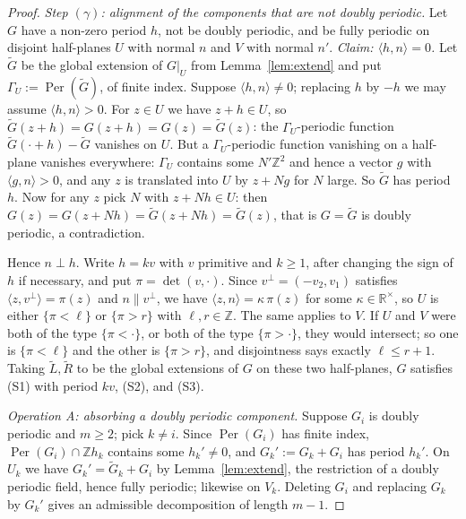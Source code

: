 \documentclass[11pt,reqno]{amsart}
\theoremstyle{plain}
\theoremstyle{definition}
\theoremstyle{remark}
\theoremstyle{plain}
\theoremstyle{remark}
\theoremstyle{definition}
\numberwithin{equation}{section}
\DeclareMathOperator{\Per}{Per}
\newcommand{\R}{\mathbb{R}}
\newcommand{\Z}{\mathbb{Z}}
\begin{document}
\begin{proof}
\emph{Step $(\gamma)$: alignment of the components that are not doubly
periodic.}  Let $G$ have a non-zero period $h$, not be doubly periodic, and be
fully periodic on disjoint half-planes $U$ with normal $n$ and $V$ with normal
$n'$.  \emph{Claim: $\langle h,n\rangle=0$.}  Let $\widetilde G$ be the global
extension of $G|_U$ from Lemma~\ref{lem:extend} and put
$\Gamma_U:=\Per(\widetilde G)$, of finite index.  Suppose
$\langle h,n\rangle\ne0$; replacing $h$ by $-h$ we may assume
$\langle h,n\rangle>0$.  For $z\in U$ we have $z+h\in U$, so
$\widetilde G(z+h)=G(z+h)=G(z)=\widetilde G(z)$: the $\Gamma_U$-periodic
function $\widetilde G(\cdot+h)-\widetilde G$ vanishes on $U$.  But a
$\Gamma_U$-periodic function vanishing on a half-plane vanishes everywhere:
$\Gamma_U$ contains some $N'\Z^2$ and hence a vector $g$ with
$\langle g,n\rangle>0$, and any $z$ is translated into $U$ by $z+Ng$ for $N$
large.  So $\widetilde G$ has period $h$.  Now for any $z$ pick $N$ with
$z+Nh\in U$: then $G(z)=G(z+Nh)=\widetilde G(z+Nh)=\widetilde G(z)$, that is
$G=\widetilde G$ is doubly periodic, a contradiction.

Hence $n\perp h$.  Write $h=kv$ with $v$ primitive and $k\ge1$, after changing
the sign of $h$ if necessary, and put $\pi=\det(v,\cdot)$.  Since
$v^\perp=(-v_2,v_1)$ satisfies $\langle z,v^\perp\rangle=\pi(z)$ and
$n\parallel v^\perp$, we have $\langle z,n\rangle=\kappa\,\pi(z)$ for some
$\kappa\in\R^\times$, so $U$ is either $\{\pi<\ell\}$ or $\{\pi>r\}$ with
$\ell,r\in\Z$.  The same applies to $V$.  If $U$ and $V$ were both of the type
$\{\pi<\cdot\}$, or both of the type $\{\pi>\cdot\}$, they would intersect; so
one is $\{\pi<\ell\}$ and the other is $\{\pi>r\}$, and disjointness says
exactly $\ell\le r+1$.  Taking $\widetilde L,\widetilde R$ to be the global
extensions of $G$ on these two half-planes, $G$ satisfies \textup{(S1)} with
period $kv$, \textup{(S2)}, and \textup{(S3)}.

\emph{Operation A: absorbing a doubly periodic component.}  Suppose $G_i$ is
doubly periodic and $m\ge2$; pick $k\ne i$.  Since $\Per(G_i)$ has finite index,
$\Per(G_i)\cap\Z h_k$ contains some $h_k'\ne0$, and $G_k':=G_k+G_i$ has period
$h_k'$.  On $U_k$ we have $G_k'=\widetilde G_k+G_i$ by
Lemma~\ref{lem:extend}, the restriction of a doubly periodic field, hence fully
periodic; likewise on $V_k$.  Deleting $G_i$ and replacing $G_k$ by $G_k'$ gives
an admissible decomposition of length $m-1$.


\end{proof}
\end{document}
